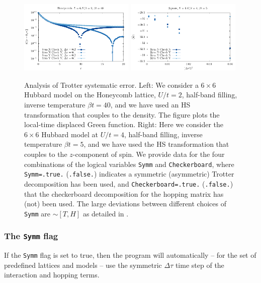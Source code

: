\begin{figure}
\center
\includegraphics[width=0.49\textwidth]{Figures/Dtau_1/Dtau_1.pdf}
\includegraphics[width=0.49\textwidth]{Figures/Dtau/Dtau.pdf}

\caption{Analysis of  Trotter systematic error.
        Left:    We consider a $6 \times 6$ Hubbard model on the Honeycomb lattice, $U/t=2$, half-band filling,  inverse temperature $\beta t =40$,  and we have used an HS transformation that couples to  the density.    The figure plots the  local-time displaced Green function.
        Right: Here we consider the $6\times 6$ Hubbard model at $U/t=4$, half-band filling,  inverse temperature $\beta t =5$, and we have used the HS transformation that couples to the $z$-component of spin.  We provide data for the four combinations of  the logical variables \texttt{Symm}  and \texttt{Checkerboard}, where  \texttt{Symm=.true.}  (\texttt{.false.})  indicates a symmetric  (asymmetric) Trotter decomposition has been used, and  \texttt{Checkerboard=.true.}  (\texttt{.false.})   that the checkerboard decomposition for the hopping matrix has (not) been used.
        The large deviations between different choices of \texttt{Symm} are $\sim [T, H]$ as detailed in \cite{goth2020}.
  }
        \label{Trotter.fig}
\end{figure}


\subsubsection{ The \texttt{Symm} flag } 

If the  \texttt{Symm}    flag is set to true,  then the program will automatically --  for the set of predefined lattices  and models -- use the symmetric   $\Delta \tau$ time step  of the interaction and 
hopping terms.

